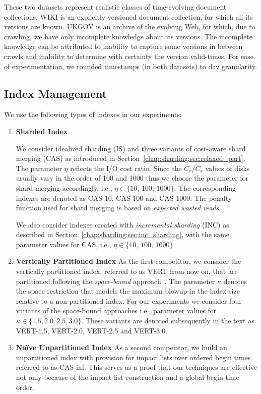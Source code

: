 These two datasets represent realistic classes of
time-evolving document collections. WIKI is an explicitly versioned
document collection, for which all its versions are known. UKGOV is an
archive of the evolving Web, for which, due to crawling, we have only
incomplete knowledge about its versions. The incomplete knowledge can be attributed to inability to capture some versions in between crawls and inability to determine with certainty the version valid-times. For ease of experimentation,
we rounded timestamps (in both datasets) to day granularity.


\subsection{Index Management}
 We use the following types of indexes in our experiments:

\begin{enumerate}

\item
\textbf{Sharded Index}
  { We consider idealized sharding (IS) and three variants of cost-aware shard merging (CAS) as introduced in Section~\ref{chap:sharding:sec:relaxed_part}. The parameter $\eta$ reflects the I/O cost ratio. Since the $C_r/C_s$ values of disks usually vary in the order of 100 and 1000 thus we choose the parameter for shard merging accordingly, i.e., $\eta \in \{ 10, \,100, \,1000 \}$. The corresponding indexes are denoted as CAS-10, CAS-100 and CAS-1000. The penalty function used for shard merging is based on \emph{expected wasted reads}.

   We also consider indexes created with \emph{incremental sharding} (INC) as described in Section~\ref{chap:sharding:sec:inc_sharding}, with the same parameter values for CAS, i.e., $\eta \in \{ 10, \,100, \,1000 \}$.}


\item
\textbf{Vertically Partitioned Index}
  {As the first competitor, we consider the vertically partitioned index, referred to as VERT from now on, that are partitioned
    following the \emph{space-bound}
    approach~\cite{kberberi:sigir2007}. The parameter $\kappa$ denotes
    the space restriction that models the maximum blowup in the index size
    relative to a non-partitioned index. For our experiments we
    consider four variants of the space-bound approaches i.e.,
    parameter values for $\kappa \in \{1.5, 2.0, 2.5, 3.0\}$. These
    variants are denoted subsequently in the text as VERT-1.5, VERT-2.0,
    VERT-2.5 and VERT-3.0.}
    

\item
\textbf{Na\"ive Unpartitioned Index}
  { As a second competitor, we build an unpartitioned index with
    provision for impact lists over ordered begin times referred to as
    CAS-inf. This serves as a proof that our techniques are effective
    not only because of the impact list construction and a global
    begin-time order.}
\end{enumerate}    

